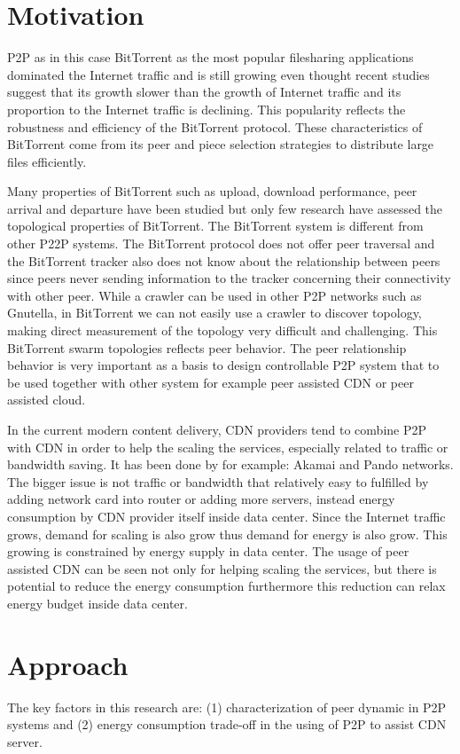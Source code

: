 \section{Motivation}
P2P as in this case BitTorrent as the most popular filesharing applications dominated the Internet traffic and is still growing even thought recent studies suggest that its growth slower than the growth of Internet traffic and its proportion to the Internet traffic is declining.
This popularity reflects the robustness and efficiency of the BitTorrent protocol.
These characteristics of BitTorrent come from its peer and piece selection strategies to distribute large files efficiently.  

Many properties of BitTorrent such as upload, download performance, peer arrival and departure have been studied but only few research have assessed the topological properties of BitTorrent.  
The BitTorrent system is different from other P22P systems. 
The BitTorrent protocol does not offer peer traversal and the BitTorrent tracker also does not know about the relationship between peers since peers never sending information to the tracker concerning their connectivity with other peer.  
While a crawler can be used in other P2P networks such as Gnutella, in BitTorrent we can not easily use a crawler to discover topology, making direct measurement of the topology very difficult and challenging. 
This BitTorrent swarm topologies reflects peer behavior.
The peer relationship behavior is very important as a basis to design controllable P2P system that to be used together with other system for example peer assisted CDN or peer assisted cloud. 

In the current modern content delivery, CDN providers tend to combine P2P with CDN in order to help the scaling the services, especially related to traffic or bandwidth saving.
It has been done by for example: Akamai and Pando networks.
The bigger issue is not traffic or bandwidth that relatively easy to fulfilled by adding network card into router or adding more servers, instead energy consumption by CDN provider itself inside data center.
Since the Internet traffic grows, demand for scaling is also grow thus demand for energy is also grow.  
This growing is constrained by energy supply in data center.
The usage of peer assisted CDN can be seen not only for helping scaling the services, but there is potential to reduce the energy consumption furthermore this reduction can relax energy budget inside data center. 


\section{Approach}
The key factors in this research are: (1) characterization of peer dynamic in P2P systems and (2) energy consumption trade-off in the using of P2P to assist CDN server.

